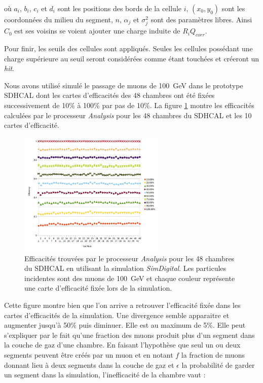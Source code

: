 où $a_i$, $b_i$, $c_i$ et $d_i$ sont les positions des bords de la cellule $i$, $(x_0,y_0)$ sont les coordonnées du milieu du segment, $n$, $\alpha_j$ et $\sigma_j^2$ sont des paramètres libres. Ainsi $C_0$ est ses voisins se voient ajouter une charge induite de $R_iQ_{corr}$.

Pour finir, les seuils des cellules sont appliqués. Seules les cellules possédant une charge supérieure au seuil seront considérées comme étant touchées et créeront un \textit{hit}.

Nous avons utilisé simulé le passage de muons de \SI{100}{\giga\eV} dans le prototype SDHCAL dont les cartes d'efficacités des \num{48} chambres ont été fixées successivement de \num{10}\% à \num{100}\% par pas de \num{10}\%. La figure \ref{effisimul} montre les efficacités calculées par le processeur \textit{Analysis} pour les \num{48} chambres du SDHCAL et les \num{10} cartes d'efficacité.

\begin{figure}[ht!]
	\centering
	\includegraphics[width=0.62\textwidth]{GLA/effisimul.jpg}
	\captionsetup{type=figure}\caption{Efficacités trouvées par le processeur \textit{Analysis} pour les \num{48} chambres du SDHCAL en utilisant la simulation \textit{SimDigital}. Les particules incidentes sont des muons de \SI{100}{\giga\eV} et chaque couleur représente une carte d'efficacité fixée lors de la simulation.}
	\label{effisimul}
\end{figure}

Cette figure montre bien que l'on arrive a retrouver l'efficacité fixée dans les cartes d'efficacités de la simulation. Une divergence semble apparaitre et augmenter jusqu'à \num{50}\% puis diminuer. Elle est au maximum de \num{5}\%. Elle peut s'expliquer par le fait qu'une fraction des muons produit plus d'un segment dans la couche de gaz d'une chambre. En faisant l'hypothèse que seul un ou deux segments peuvent être créés par un muon et en notant $f$ la fraction de muons donnant lieu à deux segments dans la couche de gaz et $\epsilon$ la probabilité de garder un segment dans la simulation, l'inefficacité de la chambre vaut :

